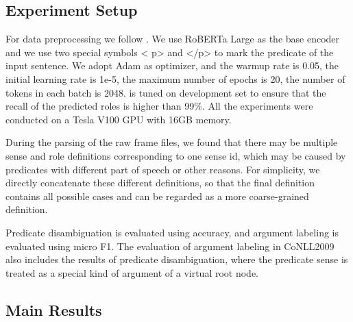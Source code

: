 \documentclass[11pt]{article}
\begin{document}
\subsection{Experiment Setup}
For data preprocessing  we follow \citep{li2019dependency}.
We use RoBERTa Large as the base encoder and we use two special symbols \textless{} p\textgreater{} and \textless{}/p\textgreater{}  to mark the predicate of the input sentence.
We adopt Adam as optimizer, and the warmup rate is 0.05, the initial learning rate is 1e-5, the maximum number of epochs is 20, the number of tokens in each batch is 2048.   is tuned on development set to ensure that the recall of the predicted roles is higher than 99\%. All the experiments were conducted on a Tesla V100 GPU with 16GB memory. 
\par
During the parsing of the raw frame files, we found that there may be multiple sense and role definitions corresponding to one sense id, which may be caused by predicates with different part of speech or other reasons. For simplicity, we directly concatenate these different definitions, so that the final definition contains all possible cases and can be regarded as a more coarse-grained definition.
\par
Predicate disambiguation is evaluated using accuracy, and argument labeling is evaluated using micro F1. The evaluation of argument labeling in CoNLL2009 also includes the results of predicate disambiguation, where the predicate sense is treated as a special kind of argument of a virtual root node.


\subsection{Main Results}
\end{document}
